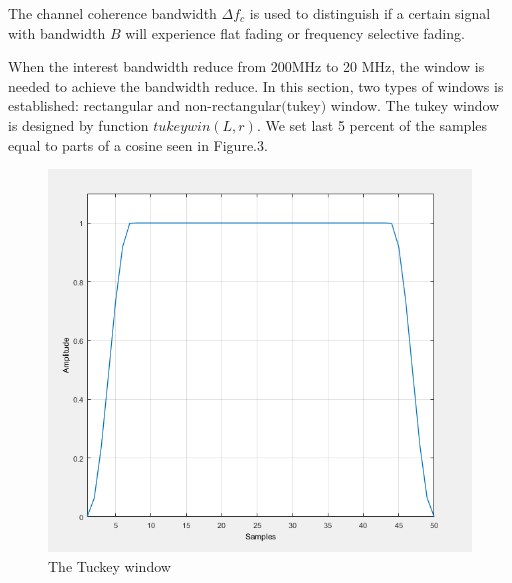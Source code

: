 \documentclass[a4paper]{article}
\begin{document}
    The channel coherence bandwidth  ${\Delta}f_c$ is used to distinguish if a certain signal with bandwidth $B$ will experience flat fading or frequency selective fading.
    
	When the interest bandwidth reduce from 200MHz to 20 MHz, the window is needed to achieve the bandwidth reduce. In this section, two types of windows is established: rectangular and non-rectangular$($tukey$)$ window. The tukey window is designed by function $tukeywin(L,r)$. We set last 5 percent of the samples equal to parts of a cosine seen in Figure.3.  
	\begin{figure}
		\centering
		\includegraphics[scale=0.4]{lab1/tukey__2_.png}
		\vspace{-0.2cm}
		\centering
		\caption{The Tuckey window}
		\label{fig:tuckey_window}
	\end{figure}
	
\end{document}
